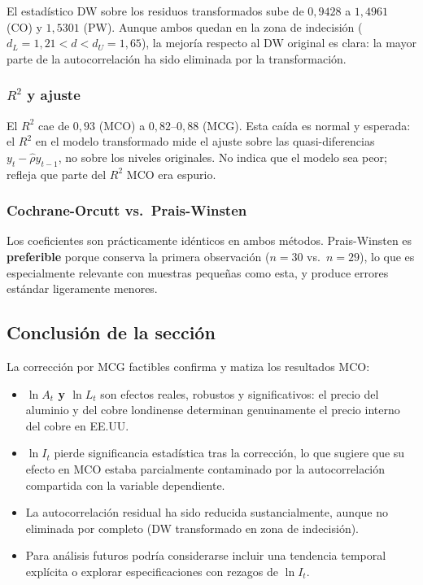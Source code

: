 \documentclass[12pt,a4paper]{article}
\begin{document}
El estadístico DW sobre los residuos transformados sube de $0{,}9428$ a
$1{,}4961$ (CO) y $1{,}5301$ (PW). Aunque ambos quedan en la zona de
indecisión ($d_L=1{,}21 < d < d_U=1{,}65$), la mejoría respecto al DW
original es clara: la mayor parte de la autocorrelación ha sido eliminada
por la transformación.

\subsubsection*{$R^2$ y ajuste}

El $R^2$ cae de $0{,}93$ (MCO) a $0{,}82$--$0{,}88$ (MCG). Esta caída es
normal y esperada: el $R^2$ en el modelo transformado mide el ajuste sobre
las quasi-diferencias $y_t - \hat\rho y_{t-1}$, no sobre los niveles
originales. No indica que el modelo sea peor; refleja que parte del $R^2$
MCO era espurio.

\subsubsection*{Cochrane-Orcutt vs.\ Prais-Winsten}

Los coeficientes son prácticamente idénticos en ambos métodos.
Prais-Winsten es \textbf{preferible} porque conserva la primera
observación ($n=30$ vs.\ $n=29$), lo que es especialmente relevante
con muestras pequeñas como esta, y produce errores estándar ligeramente
menores.

\subsection{Conclusión de la sección}

La corrección por MCG factibles confirma y matiza los resultados MCO:

\begin{itemize}
  \item \textbf{$\ln A_t$ y $\ln L_t$} son efectos reales, robustos y
        significativos: el precio del aluminio y del cobre londinense
        determinan genuinamente el precio interno del cobre en EE.UU.
  \item \textbf{$\ln I_t$} pierde significancia estadística tras la
        corrección, lo que sugiere que su efecto en MCO estaba parcialmente
        contaminado por la autocorrelación compartida con la variable dependiente.
  \item La autocorrelación residual ha sido reducida sustancialmente,
        aunque no eliminada por completo (DW transformado en zona de indecisión).
  \item Para análisis futuros podría considerarse incluir una tendencia
        temporal explícita o explorar especificaciones con rezagos de $\ln I_t$.
\end{itemize}
\end{document}
